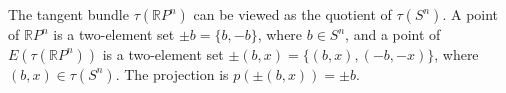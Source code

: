 The tangent bundle $\tau(\mathbb{R}P^n)$ can be viewed as the quotient of $\tau(S^n)$. A point of $\mathbb{R}P^n$ is a two-element set $\pm b = \{b, -b\}$, where $b \in S^n$, and a point of $E(\tau(\mathbb{R}P^n))$ is a two-element set $\pm (b, x) = \{(b, x), (-b, -x)\}$, where $(b, x) \in \tau(S^n)$. The projection is $p(\pm (b, x)) = \pm b$.
